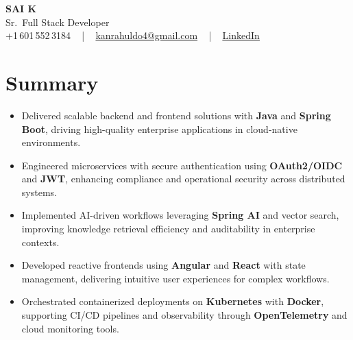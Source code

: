 \documentclass[letterpaper,11pt]{article}
\newcommand{\resumeItem}[1]{
  \item\footnotesize{
    {#1 \vspace{-2pt}}
  }
}
\newcommand{\resumeItemListStart}{\begin{itemize}[leftmargin=*]}
\newcommand{\resumeItemListEnd}{\end{itemize}\vspace{-5pt}}
\begin{document}
\begin{center}
    {\fontsize{14pt}{12pt}\selectfont \textbf{\MakeUppercase{Sai K}}}\\ \vspace{2pt}
    \fontsize{10pt}{12pt}\selectfont Sr.\ Full Stack Developer\\ \vspace{2pt}
    \fontsize{10pt}{12pt}\selectfont +1\,601\,552\,3184 ~ | ~
    \href{mailto:kanrahuldo4@gmail.com}{kanrahuldo4@gmail.com} ~ | ~
    \href{https://www.linkedin.com/in/srrrk/}{\color{blue}\underline{LinkedIn}}
    \vspace{-10pt}
\end{center}

\section{Summary}
\fontsize{9pt}{10pt}\selectfont
\resumeItemListStart
  \resumeItem{Delivered scalable backend and frontend solutions with \textbf{Java} and \textbf{Spring Boot}, driving high-quality enterprise applications in cloud-native environments.}
  \resumeItem{Engineered microservices with secure authentication using \textbf{OAuth2/OIDC} and \textbf{JWT}, enhancing compliance and operational security across distributed systems.}
  \resumeItem{Implemented AI-driven workflows leveraging \textbf{Spring AI} and vector search, improving knowledge retrieval efficiency and auditability in enterprise contexts.}
  \resumeItem{Developed reactive frontends using \textbf{Angular} and \textbf{React} with state management, delivering intuitive user experiences for complex workflows.}
  \resumeItem{Orchestrated containerized deployments on \textbf{Kubernetes} with \textbf{Docker}, supporting CI/CD pipelines and observability through \textbf{OpenTelemetry} and cloud monitoring tools.}
\resumeItemListEnd
\vspace{-6pt}

\end{document}
